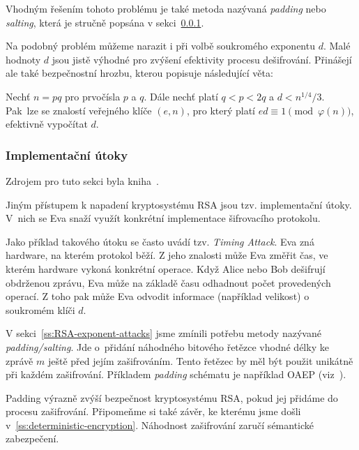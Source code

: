 \documentclass[
  program=infoi,
  biblatex=false,
  figures=true,
  glossaries,
  tables=false,
  sourcecodes=true,
  index
]{kidiplom}
\begin{document}
        Vhodným řešením tohoto problému je také metoda nazývaná \emph{padding} nebo \emph{salting}, která je stručně
        popsána v sekci~\ref{ss:RSA-implementation-attacks}.

        \bigskip

        Na podobný problém můžeme narazit i při volbě soukromého exponentu $d$.
        Malé hodnoty $d$ jsou jistě výhodné pro zvýšení efektivity procesu dešifrování.
        Přinášejí ale také bezpečnostní hrozbu, kterou popisuje následující věta:

        \begin{theorem}\label{the:weiner-attack}
            Nechť $n=pq$ pro prvočísla $p$ a $q$.
            Dále nechť platí $q < p <2q$ a $d < n^{1/4}/3$.
            Pak~lze se znalostí veřejného klíče $(e,n)$, pro který platí $ed \equiv 1 \pmod{\varphi(n)}$, efektivně vypočítat $d$. 
        \end{theorem}

    
    \subsubsection{Implementační útoky}\label{ss:RSA-implementation-attacks}
       
        Zdrojem pro tuto sekci byla kniha~\cite{rsa-and-public}.

        Jiným přístupem k napadení kryptosystému RSA jsou tzv. implementační útoky.
        V~nich se Eva snaží využít konkrétní implementace šifrovacího protokolu.

        Jako příklad takového útoku se často uvádí tzv. \emph{Timing Attack}.
        Eva zná hardware, na kterém protokol běží.
        Z jeho znalosti může Eva změřit čas, ve kterém hardware vykoná konkrétní operace.
        Když Alice nebo Bob dešifrují obdrženou zprávu, Eva může na základě času
        odhadnout počet provedených operací.
        Z toho pak může Eva odvodit informace (například velikost) o soukromém klíči $d$.

        \medskip

        V sekci~\ref{ss:RSA-exponent-attacks} jsme zmínili potřebu metody nazývané \emph{padding/salting}.
        Jde o~přidání náhodného bitového řetězce vhodné délky ke zprávě $m$ ještě před jejím zašifrováním.
        Tento řetězec by měl být použit unikátně při každém zašifrování.
        Příkladem \emph{padding} schématu je například OAEP (viz~\cite{optimal-asymmetric-encryption}).

        Padding výrazně zvýší bezpečnost kryptosystému RSA, pokud jej přidáme do procesu zašifrování.
        Připomeňme si také závěr, ke kterému jsme došli v~\ref{ss:deterministic-encryption}.
        Náhodnost zašifrování zaručí sémantické zabezpečení.
    
\end{document}
